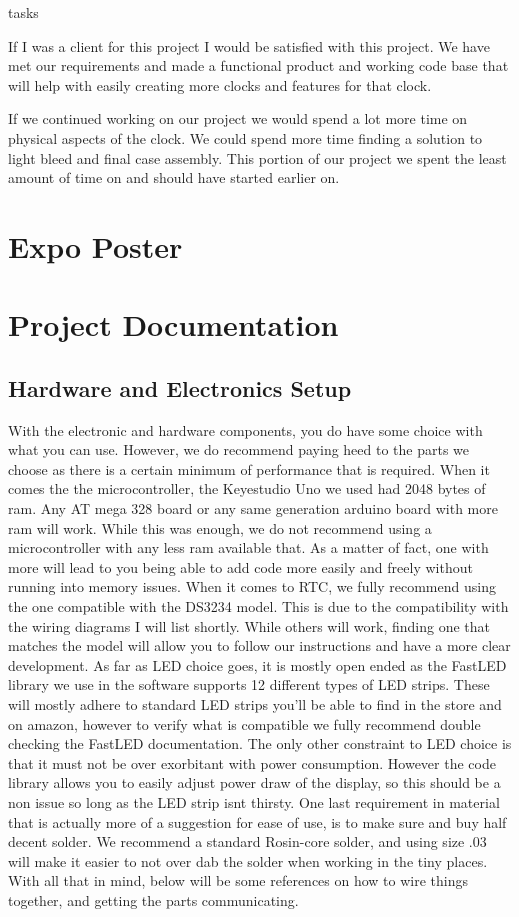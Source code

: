 tasks\documentclass[onecolumn, draftclsnofoot,10pt, compsoc]{IEEEtran}
\begin{document}
If I was a client for this project I would be satisfied with this project. We have met our requirements and made a functional product and working code base that will help with easily creating more clocks and features for that clock.

If we continued working on our project we would spend a lot more time on physical aspects of the clock. We could spend more time finding a solution to light bleed and final case assembly. This portion of our project we spent the least amount of time on and should have started earlier on.

\section{Expo Poster}
\newpage

\section{Project Documentation}
\subsection{Hardware and Electronics Setup}
With the electronic and hardware components, you do have some choice with what you can use.
However, we do recommend paying heed to the parts we choose as there is a certain minimum of performance that is required.
When it comes the the microcontroller, the Keyestudio Uno we used had 2048 bytes of ram.
Any AT mega 328 board or any same generation arduino board with more ram will work.
While this was enough, we do not recommend using a microcontroller with any less ram available that.
As a matter of fact, one with more will lead to you being able to add code more easily and freely without running into memory issues.
When it comes to RTC, we fully recommend using the one compatible with the DS3234 model.
This is due to the compatibility with the wiring diagrams I will list shortly.
While others will work, finding one that matches the model will allow you to follow our instructions and have a more clear development.
As far as LED choice goes, it is mostly open ended as the FastLED library we use in the software supports 12 different types of LED strips.
These will mostly adhere to standard LED strips you'll be able to find in the store and on amazon, however to verify what is compatible we fully recommend double checking the FastLED documentation.
The only other constraint to LED choice is that it must not be over exorbitant with power consumption.
However the code library allows you to easily adjust power draw of the display, so this should be a non issue so long as the LED strip isnt thirsty.
One last requirement in material that is actually more of a suggestion for ease of use, is to make sure and buy half decent solder.
We recommend a standard Rosin-core solder, and using size .03 will make it easier to not over dab the solder when working in the tiny places.
With all that in mind, below will be some references on how to wire things together, and getting the parts communicating.
\end{document}
